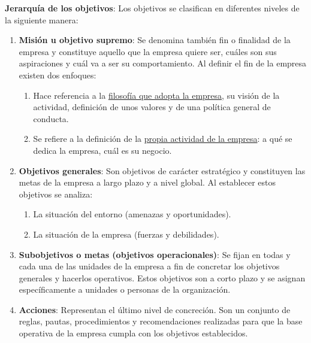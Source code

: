 \documentclass[12pt]{article}
\theoremstyle{definition_wo_parentheses}
\begin{document}
\textbf{Jerarquía de los objetivos}: Los objetivos se clasifican en diferentes niveles de la siguiente manera:
\begin{enumerate}
\item \textbf{Misión u objetivo supremo}: Se denomina también fin o finalidad de la empresa y constituye aquello que la empresa quiere ser, cuáles son sus aspiraciones y cuál va a ser su comportamiento. Al definir el fin de la empresa existen dos enfoques:
\begin{enumerate}
\item Hace referencia a la \underline{filosofía que adopta la empresa}, su visión de la actividad, definición de unos valores y de una política general de conducta.
\item Se refiere a la definición de la \underline{propia actividad de la empresa}: a qué se dedica la empresa, cuál es su negocio.
\end{enumerate}
\item \textbf{Objetivos generales}: Son objetivos de carácter estratégico y constituyen las metas de la empresa a largo plazo y a nivel global. Al establecer estos objetivos se analiza:
\begin{enumerate}
\item La situación del entorno (amenazas y oportunidades).
\item La situación de la empresa (fuerzas y debilidades).
\end{enumerate}
\item \textbf{Subobjetivos o metas (objetivos operacionales)}: Se fijan en todas y cada una de las unidades de la empresa a fin de concretar los objetivos generales y hacerlos operativos. Estos objetivos son a corto plazo y se asignan específicamente a unidades o personas de la organización.
\item \textbf{Acciones}: Representan el último nivel de concreción. Son un conjunto de reglas, pautas, procedimientos y recomendaciones realizadas para que la base operativa de la empresa cumpla con los objetivos establecidos.
\end{enumerate}
\end{document}
